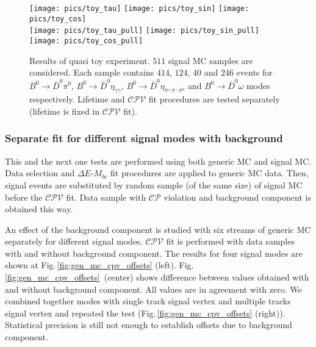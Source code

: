 \documentclass[preprint,aps,showpacs]{revtex4}
\newcommand{\cpconj}{\ensuremath{\mathcal{CP}}\xspace}
\newcommand{\cpvconj}{\ensuremath{\mathcal{CPV}}\xspace}
\newcommand{\bdpi}{\ensuremath{B^0\to \bar D^0\pi^0}\xspace}
\newcommand{\bdetagg}{\ensuremath{B^0\to \bar D^0\eta_{\gamma\gamma}}\xspace}
\newcommand{\bdetappp}{\ensuremath{B^0\to \bar D^0\eta_{\pi^+\pi^-\pi^0}}\xspace}
\newcommand{\bdomega}{\ensuremath{B^0\to \bar D^0\omega}\xspace}
\newcommand{\de}{\ensuremath{\Delta E}\xspace}
\newcommand{\mbc}{\ensuremath{M_{bc}}\xspace}
\begin{document}
\begin{figure}[htb]
 \texttt{[image: pics/toy\_tau]}
 \texttt{[image: pics/toy\_sin]}
 \texttt{[image: pics/toy\_cos]}\\
 \texttt{[image: pics/toy\_tau\_pull]} 
 \texttt{[image: pics/toy\_sin\_pull]} 
 \texttt{[image: pics/toy\_cos\_pull]}
 \caption{Results of quasi toy experiment. $511$ signal MC samples are considered. Each sample contains $414$, $124$, $40$ and $246$ events for \bdpi, \bdetagg, \bdetappp and \bdomega modes respectively. Lifetime and \cpvconj fit procedures are tested separately (lifetime is fixed in \cpvconj fit).}
 \label{fig:quasi_toy2}
\end{figure}

\subsubsection{Separate fit for different signal modes with background}\label{sec:mc_cpv_modes}
This and the next one tests are performed using both generic MC and signal MC. Data selection and \de-\mbc fit procedures are applied to generic MC data. Then, signal events are substituted by random sample (of the same size) of signal MC before the \cpvconj fit. Data sample with \cpconj violation and background component is obtained this way.

An effect of the background component is studied with six streams of generic MC separately for different signal modes. \cpvconj fit is performed with data samples with and without background component. The results for four signal modes are shown at Fig.\,\ref{fig:gen_mc_cpv_offsets} (left). Fig.\,\ref{fig:gen_mc_cpv_offsets}~(center) shows difference between values obtained with and without background component. All values are in agreement with zero. We combined together modes with single track signal vertex and multiple tracks signal vertex and repeated the test (Fig.\,\ref{fig:gen_mc_cpv_offsets} (right)). Statistical precision is still not enough to establish offsets due to background component.
\end{document}
